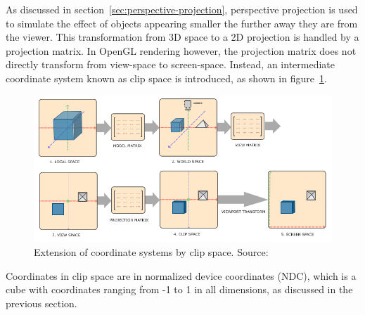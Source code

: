As discussed in section~\ref{sec:perspective-projection}, perspective projection is used
to simulate the effect of objects appearing smaller the further away they are from the viewer.
This transformation from 3D space to a 2D projection is handled by a projection matrix.
In OpenGL rendering however, the projection matrix does not directly transform from view-space to screen-space.
Instead, an intermediate coordinate system known as clip space is introduced, as shown in figure~\ref{fig:coordinate-systems-with-clip-space}.
\begin{figure}[h!]
    \centering
    \includegraphics[width=0.85\linewidth]{images/coordinate_systems}
    \caption{Extension of coordinate systems by clip space. Source: \cite{de_vries_learn_2020}}
    \label{fig:coordinate-systems-with-clip-space}
\end{figure}
Coordinates in clip space are in normalized device coordinates (NDC), which is a cube
with coordinates ranging from -1 to 1 in all dimensions, as discussed in the previous section.


